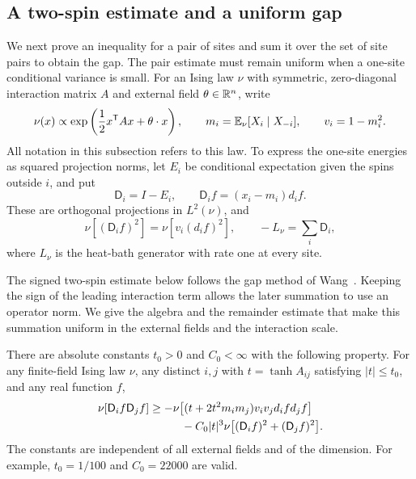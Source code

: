 \subsection{A two-spin estimate and a uniform gap}

We next prove an inequality for a pair of sites and sum it over the
set of site pairs to obtain the gap.  The pair estimate must remain
uniform when a one-site conditional variance is small.  For an Ising
law $\nu$ with symmetric, zero-diagonal interaction matrix $A$ and
external field $\theta\in\mathbb R^n$, write
\[
 \nu(x)\propto\exp\left(\frac12x^{\mathsf T}Ax+\theta\cdot x\right),
 \qquad m_i=\mathbb E_\nu[X_i\mid X_{-i}],\qquad v_i=1-m_i^2.
\]
All notation in this subsection refers to this law.  To express the
one-site energies as squared projection norms, let $E_i$ be conditional
expectation given the spins outside $i$, and put
\[
 \mathsf D_i=I-E_i,\qquad \mathsf D_i f=(x_i-m_i)d_i f.
\]
These are orthogonal projections in $L^2(\nu)$, and
\[
 \nu[(\mathsf D_i f)^2]=\nu[v_i(d_i f)^2],
 \qquad -L_\nu=\sum_i\mathsf D_i,
\]
where $L_\nu$ is the heat-bath generator with rate one at every site.

The signed two-spin estimate below follows the gap method of
Wang~\cite[Theorem~1.2 and Lemma~3.4]{Wang2026}.  Keeping the sign of the
leading interaction term allows the later summation to use an operator
norm.  We give the algebra and the remainder estimate that make this
summation uniform in the external fields and the interaction scale.

\begin{lemma}
\label{rcut:lem:two-spin}
There are absolute constants $t_0>0$ and $C_0<\infty$ with the following
property.  For any finite-field Ising law $\nu$, any distinct $i,j$ with
$t=\tanh A_{ij}$ satisfying $|t|\le t_0$, and any real function $f$,
\begin{align}
 \nu[\mathsf D_i f\mathsf D_j f]
 &\ge-\nu\bigl[(t+2t^2m_i m_j)v_i v_jd_i f d_j f\bigr]\notag\\
 &\hspace{1cm}-C_0|t|^3\nu\bigl[(\mathsf D_i f)^2+(\mathsf D_j f)^2\bigr].
 \label{rcut:eq:two-spin}
\end{align}
The constants are independent of all external fields and of the dimension.
For example, $t_0=1/100$ and $C_0=22000$ are valid.
\end{lemma}

